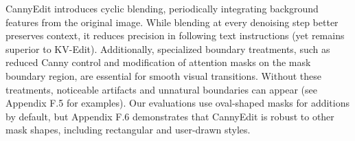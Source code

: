 \documentclass{article}
\begin{document}
CannyEdit introduces cyclic blending, periodically integrating background features from the original image. While blending at every denoising step better preserves context, it reduces precision in following text instructions (yet remains superior to KV-Edit). Additionally, specialized boundary treatments, such as reduced Canny control and modification of attention masks on the mask boundary region, are essential for smooth visual transitions. Without these treatments, noticeable artifacts and unnatural boundaries can appear (see Appendix F.5 for examples). Our evaluations use oval-shaped masks for additions by default, but Appendix F.6 demonstrates that CannyEdit is robust to other mask shapes, including rectangular and user-drawn styles.

\end{document}

